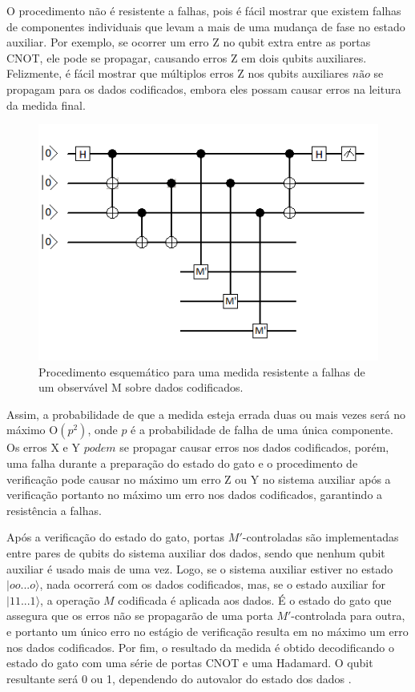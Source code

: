 \documentclass[tcc,capa]{texufpel}
\begin{document}
O procedimento não é resistente a falhas, pois é fácil mostrar que existem falhas de componentes individuais que levam a mais de uma mudança de fase no estado auxiliar. Por exemplo, se ocorrer um erro Z no qubit extra entre as portas CNOT, ele pode se propagar, causando erros Z em dois qubits auxiliares. Felizmente, é fácil mostrar que múltiplos erros Z nos qubits auxiliares $não$ se propagam para os dados codificados, embora eles possam causar erros na leitura da medida final. 
\begin{figure}[ht!]
    \centering
    \includegraphics[width=.6\textwidth]{imagens/resistenteafalhas.png}
    \caption{Procedimento esquemático para uma medida resistente a falhas de um observável M sobre dados codificados.}
    \label{fig:falhas}
\end{figure}


Assim, a probabilidade de que a medida esteja errada duas ou mais vezes será no máximo O$(p^2)$, onde $p$ é a probabilidade de falha de uma única componente. Os erros X e Y $podem$ se propagar causar erros nos dados codificados, porém, uma falha durante a preparação do estado do gato e o procedimento de verificação pode causar no máximo um erro Z ou Y no sistema auxiliar após a verificação portanto no máximo um erro nos dados codificados, garantindo a resistência a falhas. 

Após a verificação do estado do gato, portas $M'$-controladas são implementadas entre pares de qubits do sistema auxiliar dos dados, sendo que nenhum qubit auxiliar é usado mais de uma vez. Logo, se o sistema auxiliar estiver no estado $|oo...o\rangle$, nada ocorrerá com os dados codificados, mas, se o estado auxiliar for $|11...1\rangle$, a operação $M$ codificada é aplicada aos dados. É o estado do gato que assegura que os erros não se propagarão de uma porta $M'$-controlada para outra, e portanto um único erro no estágio de verificação resulta em no máximo um erro nos dados codificados. Por fim, o resultado da medida é obtido decodificando o estado do gato com uma série de portas CNOT e uma Hadamard. O qubit resultante será 0 ou 1, dependendo do autovalor do estado dos dados \cite{chuang00a}. 
\end{document}
